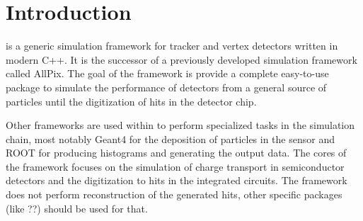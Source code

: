 \section{Introduction}
\apsq is a generic simulation framework for tracker and vertex detectors written in modern C++. It is the successor of a previously developed simulation framework called AllPix\cite{ap1wiki}\cite{ap1git}. The goal of the \apsq framework is provide a complete easy-to-use package to simulate the performance of detectors from a general source of particles until the digitization of hits in the detector chip. 

Other frameworks are used within \apsq to perform specialized tasks in the simulation chain, most notably Geant4\cite{geant4} for the deposition of particles in the sensor and ROOT\cite{root} for producing histograms and generating the output data. The cores of the framework focuses on the simulation of charge transport in semiconductor detectors and the digitization to hits in the integrated circuits. The framework does not perform reconstruction of the generated hits, other specific packages (like ??) should be used for that.

